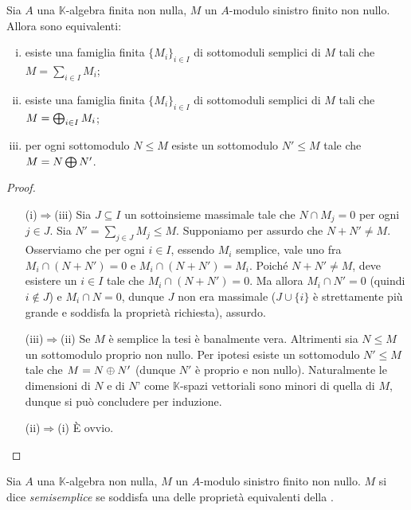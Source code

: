 \begin{proposition}
Sia $A$ una $\mathbb{K}$-algebra finita non nulla, $M$ un $A$-modulo sinistro finito non nullo. Allora sono equivalenti:
\begin{enumerate}[(i)]
\item esiste una famiglia finita $\{M_i\}_{i\in I}$ di sottomoduli semplici di $M$ tali che $M=\sum_{i\in I}M_i$;
\item esiste una famiglia finita $\{M_i\}_{i\in I}$ di sottomoduli semplici di $M$ tali che $M=\bigoplus_{i\in I}M_i$;
\item per ogni sottomodulo $N\le M$ esiste un sottomodulo $N'\le M$ tale che $M=N\bigoplus N'$.
\end{enumerate}
\end{proposition}
\begin{proof}
\leavevmode
\begin{itemize}
\item[(i)$\Rightarrow$(iii)] Sia $J\subseteq I$ un sottoinsieme massimale tale che $N\cap M_j=0$ per ogni $j\in J$. Sia $N'=\sum_{j\in J}M_j\le M$. Supponiamo per assurdo che $N+N'\neq M$. Osserviamo che per ogni $i\in I$, essendo $M_i$ semplice, vale uno fra $M_i\cap(N+N')=0$ e $M_i\cap(N+N')=M_i$. Poiché $N+N'\neq M$, deve esistere un $i\in I$ tale che $M_i\cap(N+N')=0$. Ma allora $M_i\cap N'=0$ (quindi $i\not\in J$) e $M_i\cap N=0$, dunque $J$ non era massimale ($J\cup\{i\}$ è strettamente più grande e soddisfa la proprietà richiesta), assurdo.
\item[(iii)$\Rightarrow$(ii)] Se $M$ è semplice la tesi è banalmente vera. Altrimenti sia $N\le M$ un sottomodulo proprio non nullo. Per ipotesi esiste un sottomodulo $N'\le M$ tale che $M=N\oplus N'$ (dunque $N'$ è proprio e non nullo). Naturalmente le dimensioni di $N$ e di $N$' come $\mathbb{K}$-spazi vettoriali sono minori di quella di $M$, dunque si può concludere per induzione.
\item[(ii)$\Rightarrow$(i)] È ovvio.
\end{itemize}
\end{proof}

\begin{definition}
Sia $A$ una $\mathbb{K}$-algebra non nulla, $M$ un $A$-modulo sinistro finito non nullo. $M$ si dice \emph{semisemplice} se soddisfa una delle proprietà equivalenti della .
\end{definition}

